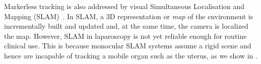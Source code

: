 Markerless tracking is also addressed by visual Simultaneous Localisation and Mapping (SLAM)~\cite{Thrun2002Robotic,Mahmoud2017}. 
In SLAM,  a 3D representation or \textit{map} of the environment is incrementally built and updated and, at the same time, the camera is localized \wrt the map.
However, SLAM in laparoscopy is not yet reliable enough for routine clinical use. %
This is because monocular SLAM systems assume a rigid scene and hence are incapable of tracking a mobile organ such as the uterus, as we show in .

